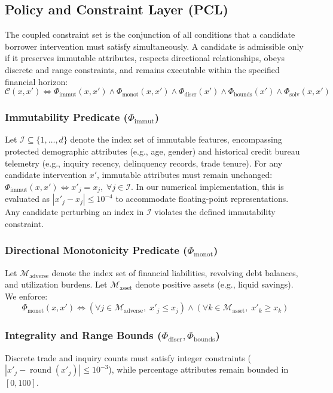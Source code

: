 \documentclass[manuscript,screen,review,anonymous]{acmart}
\begin{document}
\subsection{Policy and Constraint Layer (PCL)}
The coupled constraint set is the conjunction of all conditions that a candidate borrower intervention must satisfy simultaneously. A candidate is admissible only if it preserves immutable attributes, respects directional relationships, obeys discrete and range constraints, and remains executable within the specified financial horizon:
\begin{equation}
\mathcal{C}(x, x') \iff \Phi_{\text{immut}}(x, x') \land \Phi_{\text{monot}}(x, x') \land \Phi_{\text{discr}}(x') \land \Phi_{\text{bounds}}(x') \land \Phi_{\text{solv}}(x, x')
\end{equation}

\subsubsection{Immutability Predicate ($\Phi_{\text{immut}}$)}
Let $\mathcal{I} \subseteq \{1, \dots, d\}$ denote the index set of immutable features, encompassing protected demographic attributes (e.g., age, gender) and historical credit bureau telemetry (e.g., inquiry recency, delinquency records, trade tenure). For any candidate intervention $x'$, immutable attributes must remain unchanged: $\Phi_{\text{immut}}(x, x') \iff x'_j = x_j, \; \forall j \in \mathcal{I}$. In our numerical implementation, this is evaluated as $|x'_j - x_j| \le 10^{-4}$ to accommodate floating-point representations. Any candidate perturbing an index in $\mathcal{I}$ violates the defined immutability constraint.

\subsubsection{Directional Monotonicity Predicate ($\Phi_{\text{monot}}$)}
Let $\mathcal{M}_{\text{adverse}}$ denote the index set of financial liabilities, revolving debt balances, and utilization burdens. Let $\mathcal{M}_{\text{asset}}$ denote positive assets (e.g., liquid savings). We enforce:
\begin{equation}
\Phi_{\text{monot}}(x, x') \iff \left( \forall j \in \mathcal{M}_{\text{adverse}}, \; x'_j \le x_j \right) \land \left( \forall k \in \mathcal{M}_{\text{asset}}, \; x'_k \ge x_k \right)
\end{equation}

\subsubsection{Integrality and Range Bounds ($\Phi_{\text{discr}}, \Phi_{\text{bounds}}$)}
Discrete trade and inquiry counts must satisfy integer constraints ($|x'_j - \operatorname{round}(x'_j)| \le 10^{-3}$), while percentage attributes remain bounded in $[0, 100]$.
\end{document}
